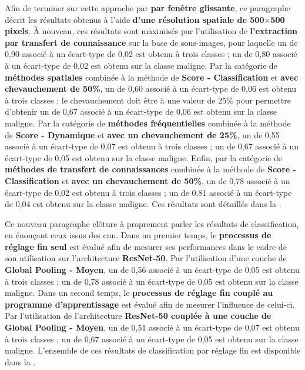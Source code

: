 Afin de terminer sur cette approche par \textbf{par fenêtre glissante}, ce paragraphe décrit les résultats obtenus à l'aide \textbf{d'une résolution spatiale de 500$\times$500 pixels}. À nouveau, ces résultats sont maximisés par l'utilisation de \textbf{l'extraction par transfert de connaissance} sur la base de sous-images, pour laquelle un \fscore{} de 0,90 associé à un écart-type de 0,02 est obtenu à trois classes ; un \fscore{} de 0,80 associé à un écart-type de 0,02 est obtenu sur la classe maligne. Par la catégorie de \textbf{méthodes spatiales} combinée à la méthode de \textbf{Score - Classification} et \textbf{avec chevauchement de 50\%}, un \fscore{} de 0,60 associé à un écart-type de 0,06 est obtenu à trois classes ; le chevauchement doit être à une valeur de 25\% pour permettre d'obtenir un \fscore{} de 0,67 associé à un écart-type de 0,06 est obtenu sur la classe maligne. Par la catégorie de \textbf{méthodes fréquentielles} combinée à la méthode de \textbf{Score - Dynamique} et \textbf{avec un chevauchement de 25\%}, un \fscore{} de 0,55 associé à un écart-type de 0,07 est obtenu à trois classes ; un \fscore{} de 0,67 associé à un écart-type de 0,05 est obtenu sur la classe maligne. Enfin, par la catégorie de \textbf{méthodes de transfert de connaissances} combinée à la méthode de \textbf{Score - Classification} et \textbf{avec un chevauchement de 50\%}, un \fscore{} de 0,78 associé à un écart-type de 0,02 est obtenu à trois classes ; un \fscore{} de 0,81 associé à un écart-type de 0,04 est obtenu sur la classe maligne. Ces résultats sont détaillés dans la .\par

Ce nouveau paragraphe clôture à proprement parler les résultats de classification, en énonçant ceux issus des \gls{cnn}. Dans un premier temps, le \textbf{processus de réglage fin seul} est évalué afin de mesurer ses performances dans le cadre de son utilisation sur l'architecture \textbf{ResNet-50}. Par l'utilisation d'une couche de \textbf{Global Pooling - Moyen}, un \fscore{} de 0,56 associé à un écart-type de 0,05 est obtenu à trois classes ; un \fscore{} de 0,78 associé à un écart-type de 0,05 est obtenu sur la classe maligne. Dans un second temps, le \textbf{processus de réglage fin couplé au programme d'apprentissage} est évalué afin de mesurer l'influence de celui-ci. Par l'utilisation de l'architecture \textbf{ResNet-50 couplée à une couche de Global Pooling - Moyen}, un \fscore{} de 0,51 associé à un écart-type de 0,07 est obtenu à trois classes ; un \fscore{} de 0,67 associé à un écart-type de 0,05 est obtenu sur la classe maligne. L'ensemble de ces résultats de classification par réglage fin est disponible dans la .\par

